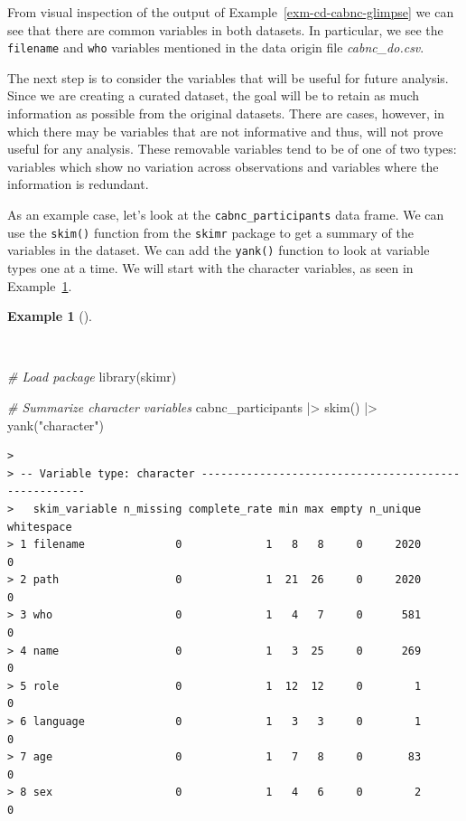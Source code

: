\documentclass[
  letterpaper,
]{latex/krantz}
\newenvironment{Shaded}{\begin{snugshade}}{\end{snugshade}}
\newcommand{\CommentTok}[1]{\textcolor[rgb]{0.00,0.00,0.00}{\textit{#1}}}
\newcommand{\FunctionTok}[1]{\textcolor[rgb]{0.00,0.00,0.00}{#1}}
\newcommand{\NormalTok}[1]{\textcolor[rgb]{0.00,0.00,0.00}{#1}}
\newcommand{\SpecialCharTok}[1]{\textcolor[rgb]{0.00,0.00,0.00}{#1}}
\newcommand{\StringTok}[1]{\textcolor[rgb]{0.00,0.00,0.00}{#1}}
\theoremstyle{definition}
\newtheorem{example}{Example}[chapter]
\theoremstyle{remark}
\begin{document}
From visual inspection of the output of
Example~\ref{exm-cd-cabnc-glimpse} we can see that there are common
variables in both datasets. In particular, we see the \texttt{filename}
and \texttt{who} variables mentioned in the data origin file
\emph{cabnc\_do.csv}.

The next step is to consider the variables that will be useful for
future analysis. Since we are creating a curated dataset, the goal will
be to retain as much information as possible from the original datasets.
There are cases, however, in which there may be variables that are not
informative and thus, will not prove useful for any analysis. These
removable variables tend to be of one of two types: variables which show
no variation across observations and variables where the information is
redundant.

As an example case, let's look at the \texttt{cabnc\_participants} data
frame. We can use the \texttt{skim()} function from the \texttt{skimr}
package to get a summary of the variables in the dataset. We can add the
\texttt{yank()} function to look at variable types one at a time. We
will start with the character variables, as seen in
Example~\ref{exm-cd-cabnc-skim-character}.

\begin{example}[]\protect\hypertarget{exm-cd-cabnc-skim-character}{}\label{exm-cd-cabnc-skim-character}

~

\begin{Shaded}
\begin{Highlighting}[]
\CommentTok{\# Load package}
\FunctionTok{library}\NormalTok{(skimr)}

\CommentTok{\# Summarize character variables}
\NormalTok{cabnc\_participants }\SpecialCharTok{|\textgreater{}}
  \FunctionTok{skim}\NormalTok{() }\SpecialCharTok{|\textgreater{}}
  \FunctionTok{yank}\NormalTok{(}\StringTok{"character"}\NormalTok{)}
\end{Highlighting}
\end{Shaded}

\begin{verbatim}
> 
> -- Variable type: character ----------------------------------------------------
>   skim_variable n_missing complete_rate min max empty n_unique whitespace
> 1 filename              0             1   8   8     0     2020          0
> 2 path                  0             1  21  26     0     2020          0
> 3 who                   0             1   4   7     0      581          0
> 4 name                  0             1   3  25     0      269          0
> 5 role                  0             1  12  12     0        1          0
> 6 language              0             1   3   3     0        1          0
> 7 age                   0             1   7   8     0       83          0
> 8 sex                   0             1   4   6     0        2          0
\end{verbatim}

\end{example}
\end{document}
